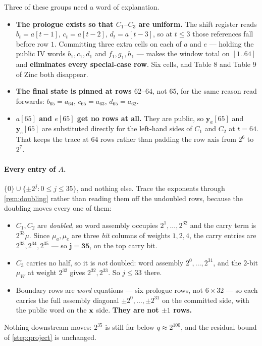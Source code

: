 Three of these groups need a word of explanation.

\begin{itemize}[leftmargin=1.4em,itemsep=3pt,topsep=4pt]
  \item \textbf{The prologue exists so that $C_1$--$C_3$ are uniform.} The shift
        register reads $b_t=a[t{-}1]$, $c_t=a[t{-}2]$, $d_t=a[t{-}3]$, so at
        $t\leq3$ those references fall before row $1$. Committing three extra
        cells on each of $a$ and $e$ --- holding the public IV words
        $b_1,c_1,d_1$ and $f_1,g_1,h_1$ --- makes the window total on $[1..64]$
        and \textbf{eliminates every special-case row}. Six cells, and Table 8
        and Table 9 of Zinc\raisebox{0.1ex}{+} both disappear.
  \item \textbf{The final state is pinned at rows $62$--$64$}, not $65$, for the
        same reason read forwards: $b_{65}=a_{64}$, $c_{65}=a_{63}$,
        $d_{65}=a_{62}$.
  \item \textbf{$a[65]$ and $e[65]$ get no rows at all.} They are public, so
        $\mathbf y_a[65]$ and $\mathbf y_e[65]$ are substituted directly for the
        left-hand sides of $C_1$ and $C_2$ at $t=64$. That keeps the trace at
        $64$ rows rather than padding the row axis from $2^6$ to $2^7$.
\end{itemize}

\paragraph{Every entry of $A$.}
$\{0\}\cup\{\pm2^j : 0\leq j\leq 35\}$, and nothing else. Trace the exponents
through \cref{rem:doubling} rather than reading them off the undoubled rows,
because the doubling moves every one of them:
\begin{itemize}[leftmargin=1.4em,itemsep=2pt,topsep=4pt]
  \item $C_1,C_2$ are \emph{doubled}, so word assembly occupies
        $2^1,\dots,2^{32}$ and the carry term is $2^{33}\mu$. Since $\mu_a,\mu_e$
        are three \emph{bit} columns of weights $1,2,4$, the carry entries are
        $2^{33},2^{34},2^{35}$ --- so $\mathbf{j=35}$, on the top carry bit.
  \item $C_3$ carries no half, so it is \emph{not} doubled: word assembly
        $2^0,\dots,2^{31}$, and the $2$-bit $\mu_W$ at weight $2^{32}$ gives
        $2^{32},2^{33}$. So $j\leq33$ there.
  \item Boundary rows are \emph{word} equations --- six prologue rows, not
        $6\times32$ --- so each carries the full assembly diagonal
        $\pm2^0,\dots,\pm2^{31}$ on the committed side, with the public word on
        the $\mathbf{x}$ side. \textbf{They are not $\pm1$ rows.}
\end{itemize}
Nothing downstream moves: $2^{35}$ is still far below $q\approx2^{100}$, and the
residual bound of \cref{step:project} is unchanged.

